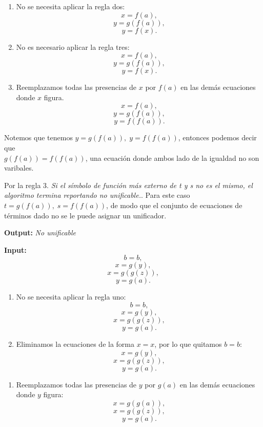 \documentclass[12pt,letterpaper]{article}
\begin{document}
\begin{enumerate}
\begin{enumerate}[label=\arabic*)]
  \item \checkmark No se necesita aplicar la regla dos:
    \[
    x = f(a),
    \]
    \[
    y = g(f(a)),
    \]
    \[
    y = f(x).
    \]

  \item \checkmark No es necesario aplicar la regla tres:
    \[
    x = f(a),
    \]
    \[
    y = g(f(a)),
    \]
    \[
    y = f(x).
    \]

  \item Reemplazamos todas las presencias de $x$ por $f(a)$ en las dem\'{a}s ecuaciones donde $x$ figura.
    \[
    x = f(a),
    \]
    \[
    y = g(f(a)),
    \]
    \[
    y = f(f(a)).
    \]
  \end{enumerate}
  
  Notemos que tenemos $y = g(f(a)),\; y = f(f(a))$, entonces podemos decir que\\
  $g(f(a)) = f(f(a))$, una ecuaci\'{o}n donde ambos lado de la igualdad no son varibales.

  Por la regla 3. \textit{Si el s\'{i}mbolo de funci\'{o}n m\'{a}s externo de t y s no es el mismo, el algoritmo termina reportando no unificable.}. Para este caso $t = g(f(a)),\; s = f(f(a))$, de modo que el conjunto de ecuaciones de t\'{e}rminos dado no se le puede asignar un unificador.
  
  \begin{center}
    \textbf{Output:} \textit{No unificable}
  \end{center}
 
  \textbf{Input:}
  \[
  b = b,
  \]
  \[
  x = g(y),
  \]
  \[
  x = g(g(z)),
  \]
  \[
  y = g(a).
  \]
  
  \begin{enumerate}[label=\arabic*)]
  \item \checkmark No se necesita aplicar la regla uno:
    \[
    b = b,
    \]
    \[
    x = g(y),
    \]
    \[
    x = g(g(z)),
    \]
    \[
    y = g(a).
    \]
    
  \item Eliminamos la ecuaciones de la forma \( x = x \), por lo que quitamos \( b = b \):
    \[
    x = g(y),
    \]
    \[
    x = g(g(z)),
    \]
    \[
    y = g(a).
    \]
  \end{enumerate}

  \begin{enumerate}[label=\arabic*), start=4]
  \item Reemplazamos todas las presencias de $y$ por $g(a)$ en las dem\'{a}s ecuaciones donde $y$ figura:
    \[
    x = g(g(a)),
    \]
    \[
    x = g(g(z)),
    \]
    \[
    y = g(a).
    \]
  \end{enumerate}


\end{enumerate}
\end{document}
